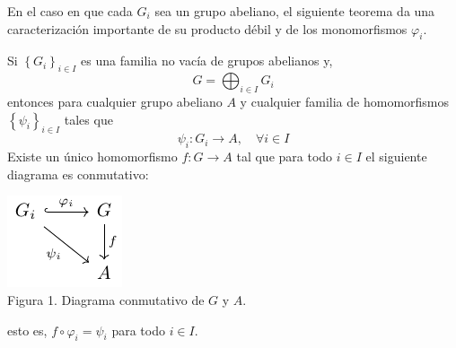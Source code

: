 \documentclass[12pt]{report}
\theoremstyle{largebreak}
\newcommand\cf[3]{\ensuremath{#1:#2\rightarrow#3}}
\begin{document}
    En el caso en que cada $G_i$ sea un grupo abeliano, el siguiente teorema da una caracterización importante de su producto débil y de los monomorfismos $\varphi_i$.

    \begin{theor}
        \label{caractSumDir_1}
        Si $\left\{G_i \right\}_{ i\in I}$ es una familia no vacía de grupos abelianos y,
        \begin{equation*}
            G=\bigoplus_{ i\in I}G_i
        \end{equation*}
        entonces para cualquier grupo abeliano $A$ y cualquier familia de homomorfismos $\left\{\psi_i\right\}_{ i\in I}$ tales que
        \begin{equation*}
            \cf{\psi_i}{G_i}{A},\quad\forall i\in I
        \end{equation*}
        Existe un único homomorfismo $\cf{f}{G}{A}$ tal que para todo $i\in I$ el siguiente diagrama es conmutativo:

        \begin{minipage}{\textwidth}
            \begin{center}
                \includegraphics[scale=1.5]{images/fig_1.pdf}\\
                Figura 1. Diagrama conmutativo de $G$ y $A$.
            \end{center}
        \end{minipage}

        esto es, $f\circ\varphi_i=\psi_i$ para todo $i\in I$.
    \end{theor}
\end{document}
